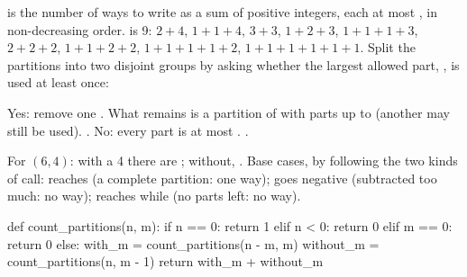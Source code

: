 \documentclass[10pt]{scrartcl}
\begin{document}
\begin{fig}
\end{fig}

\begin{example*}
 is the number of ways to write  as a sum of positive integers, each at most , in non-decreasing order.  is 9: $2+4$, $1+1+4$, $3+3$, $1+2+3$, $1+1+1+3$, $2+2+2$, $1+1+2+2$, $1+1+1+1+2$, $1+1+1+1+1+1$. Split the partitions into two disjoint groups by asking whether the largest allowed part, , is used at least once:
\begin{itemize}
  \ii Yes: remove one . What remains is a partition of  with parts up to  (another  may still be used). .
  \ii No: every part is at most . .
\end{itemize}
For $(6,4)$: with a 4 there are ; without, . Base cases, by following the two kinds of call:  reaches  (a complete partition: one way);  goes negative (subtracted too much: no way);  reaches  while  (no parts left: no way).
\begin{py}
def count_partitions(n, m):
    if n == 0:
        return 1
    elif n < 0:
        return 0
    elif m == 0:
        return 0
    else:
        with_m = count_partitions(n - m, m)
        without_m = count_partitions(n, m - 1)
        return with_m + without_m
\end{py}
\end{example*}
\end{document}
